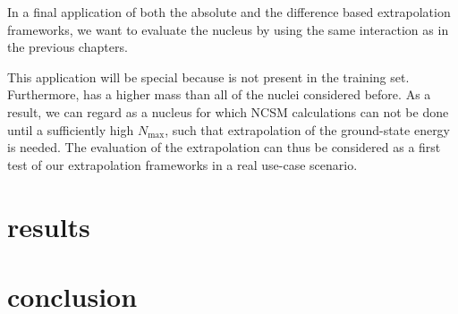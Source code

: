 In a final application of both the absolute and the difference based extrapolation frameworks, we want to evaluate the nucleus  by using the same interaction as in the previous chapters.

This application will be special because  is not present in the training set. Furthermore,  has a higher mass than all of the nuclei considered before. As a result, we can regard  as a nucleus for which NCSM calculations can not be done until a sufficiently high $N_\mathrm{max}$, such that extrapolation of the ground-state energy is needed. The evaluation of the  extrapolation can thus be considered as a first test of our extrapolation frameworks in a real use-case scenario.
\section{results}

\section{conclusion}

